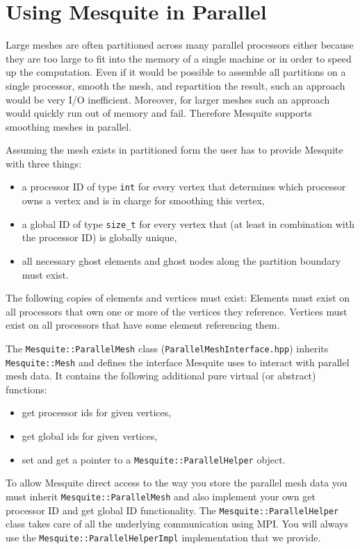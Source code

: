 \chapter{Using Mesquite in Parallel}
\label{sec:meshes}

Large meshes are often partitioned across many parallel processors either because they are too large to fit into the memory of a single machine or in order to speed up the computation. Even if it would be possible to assemble all partitions on a single processor, smooth the mesh, and repartition the result, such an approach would be very I/O inefficient. Moreover, for larger meshes such an approach would quickly run out of memory and fail. Therefore Mesquite supports smoothing meshes in parallel.

Assuming the mesh exists in partitioned form the user has to provide Mesquite with three things:
\begin{itemize}
\item a processor ID of type \texttt{int} for every vertex that determines which processor owns a vertex and is in charge for smoothing this vertex,
\item a global ID of type \texttt{size\_t} for every vertex that (at least in combination with the processor ID) is globally unique,
\item all necessary ghost elements and ghost nodes along the partition boundary must exist.
\end{itemize}

The following copies of elements and vertices must exist: Elements must exist on all processors that own one or more of the vertices they reference. Vertices must exist on all processors that have some element referencing them.

The \texttt{Mesquite::ParallelMesh} class (\texttt{ParallelMeshInterface.hpp}) inherits \texttt{Mesquite::Mesh} and defines the interface Mesquite uses to interact with parallel mesh data. It contains the following additional pure virtual (or abstract) functions:
\begin{itemize}
\item get processor ids for given vertices,
\item get global ids for given vertices,
\item set and get a pointer to a \texttt{Mesquite::ParallelHelper} object.
\end{itemize}

To allow Mesquite direct access to the way you store the parallel mesh data you must inherit \texttt{Mesquite::ParallelMesh} and also implement your own get processor ID and get global ID functionality. The \texttt{Mesquite::ParallelHelper} class takes care of all the underlying communication using MPI. You will always use the \texttt{Mesquite::ParallelHelperImpl} implementation that we provide.


